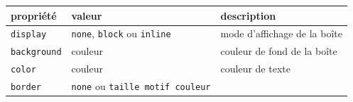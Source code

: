 \documentclass[a4paper,17pt]{extarticle}
\begin{document}
\begin{reponse}
            \end{reponse}\begin{exemple}
    \begin{longtable}[]{@{}lll@{}}
\toprule
\begin{minipage}[b]{0.31\columnwidth}\raggedright
propriété\strut
\end{minipage} & \begin{minipage}[b]{0.23\columnwidth}\raggedright
valeur\strut
\end{minipage} & \begin{minipage}[b]{0.37\columnwidth}\raggedright
description\strut
\end{minipage}\tabularnewline
\midrule
\endhead
\begin{minipage}[t]{0.31\columnwidth}\raggedright
\texttt{display}\strut
\end{minipage} & \begin{minipage}[t]{0.23\columnwidth}\raggedright
\texttt{none}, \texttt{block} ou \texttt{inline}\strut
\end{minipage} & \begin{minipage}[t]{0.37\columnwidth}\raggedright
mode d'affichage de la boîte\strut
\end{minipage}\tabularnewline
\begin{minipage}[t]{0.31\columnwidth}\raggedright
\texttt{background}\strut
\end{minipage} & \begin{minipage}[t]{0.23\columnwidth}\raggedright
couleur\strut
\end{minipage} & \begin{minipage}[t]{0.37\columnwidth}\raggedright
couleur de fond de la boîte\strut
\end{minipage}\tabularnewline
\begin{minipage}[t]{0.31\columnwidth}\raggedright
\texttt{color}\strut
\end{minipage} & \begin{minipage}[t]{0.23\columnwidth}\raggedright
couleur\strut
\end{minipage} & \begin{minipage}[t]{0.37\columnwidth}\raggedright
couleur de texte\strut
\end{minipage}\tabularnewline
\begin{minipage}[t]{0.31\columnwidth}\raggedright
\texttt{border}\strut
\end{minipage} & \begin{minipage}[t]{0.23\columnwidth}\raggedright
\texttt{none} ou \texttt{taille\ motif\ couleur}\strut

\end{minipage}
\end{longtable}
\end{exemple}
\end{document}
